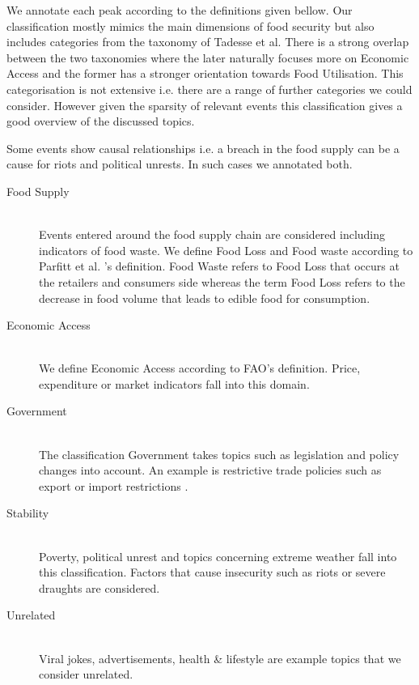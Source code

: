 We annotate each peak according to the definitions given bellow. Our classification mostly mimics the main dimensions of food security but also includes categories from the taxonomy of Tadesse et al\cite{Tadesse2014}. There is a strong overlap between the two taxonomies where the later naturally focuses more on Economic Access and the former has a stronger orientation towards Food Utilisation. This categorisation is not extensive i.e. there are a range of further categories we could consider. However given the sparsity of relevant events this classification gives a good overview of the discussed topics. 

Some events show causal relationships i.e. a breach in the food supply can be a cause for riots and political unrests. In such cases we annotated both. 


\begin{description}
  \item[Food Supply ] \hfill \\
 Events entered around the food supply chain are considered including indicators of food waste. We define Food Loss and Food waste according to Parfitt et al. 's \cite{Julian10} definition. Food Waste refers to Food Loss that occurs at the retailers and consumers side whereas the term Food Loss refers to the decrease in food volume that leads to edible food for consumption.
  \item[Economic Access] \hfill \\
  We define Economic Access according to FAO's \cite{fao2008} definition. Price, expenditure or market indicators fall into this domain.   
  \item[Government] \hfill \\
  The classification Government takes topics such as legislation and policy changes into account. An example is restrictive trade policies such as export or import restrictions  \cite{Tadesse2014}. 
    \item[Stability] \hfill \\
 Poverty,  political unrest and topics concerning extreme weather \cite{fao2008} fall into this classification. Factors that cause insecurity such as riots or severe draughts are considered. 
    \item[Unrelated] \hfill \\
   Viral jokes,  advertisements, health \& lifestyle are example topics that we consider unrelated. 



\end{description}








